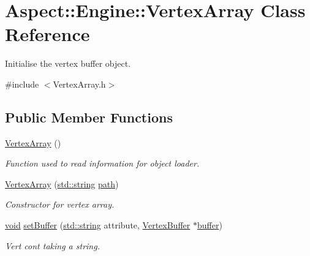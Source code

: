 \hypertarget{class_aspect_1_1_engine_1_1_vertex_array}{}\section{Aspect\+:\+:Engine\+:\+:Vertex\+Array Class Reference}
\label{class_aspect_1_1_engine_1_1_vertex_array}


Initialise the vertex buffer object.  




{\ttfamily \#include $<$Vertex\+Array.\+h$>$}

\subsection*{Public Member Functions}
\begin{DoxyCompactItemize}
\item 
\mbox{\hyperlink{class_aspect_1_1_engine_1_1_vertex_array_a48a7d8516fbe14a78e48b7494a5c569c}{Vertex\+Array}} ()
\begin{DoxyCompactList}\small\item\em Function used to read information for object loader. \end{DoxyCompactList}\item 
\mbox{\hyperlink{class_aspect_1_1_engine_1_1_vertex_array_a684a84192f2f5f14de6cff0a14ef686b}{Vertex\+Array}} (\mbox{\hyperlink{_s_d_l__opengl__glext_8h_ae84541b4f3d8e1ea24ec0f466a8c568b}{std\+::string}} \mbox{\hyperlink{_s_d_l__opengl__glext_8h_ab25d8cd967ccbd19b630d7100ff8f67e}{path}})
\begin{DoxyCompactList}\small\item\em Constructor for vertex array. \end{DoxyCompactList}\item 
\mbox{\hyperlink{_s_d_l__opengles2__gl2ext_8h_ae5d8fa23ad07c48bb609509eae494c95}{void}} \mbox{\hyperlink{class_aspect_1_1_engine_1_1_vertex_array_a0d986459ab43f774a9201667ff49672f}{set\+Buffer}} (\mbox{\hyperlink{_s_d_l__opengl__glext_8h_ae84541b4f3d8e1ea24ec0f466a8c568b}{std\+::string}} attribute, \mbox{\hyperlink{class_aspect_1_1_engine_1_1_vertex_buffer}{Vertex\+Buffer}} $\ast$\mbox{\hyperlink{_s_d_l__opengl__glext_8h_a76461e97a098d2c9ae20ac193d3825ae}{buffer}})
\begin{DoxyCompactList}\small\item\em Vert cont taking a string. \end{DoxyCompactList}\item 

\end{DoxyCompactItemize}
